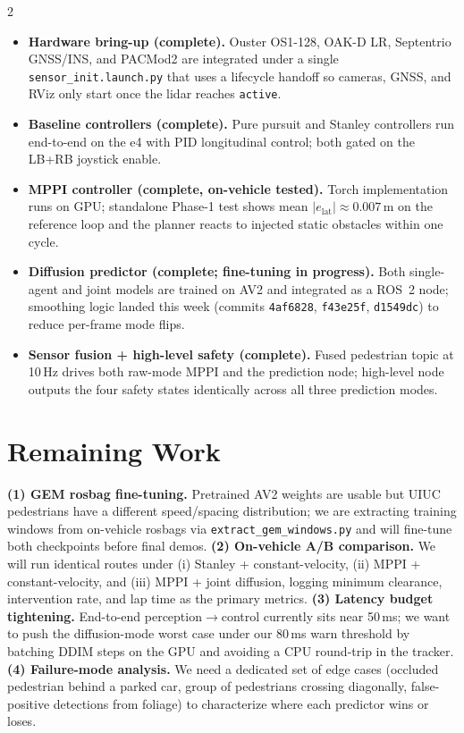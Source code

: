 \documentclass[10pt,letterpaper]{article}
\begin{document}
\begin{multicols}{2}
\begin{itemize}
  \item \textbf{Hardware bring-up (complete).} Ouster OS1-128, OAK-D LR,
        Septentrio GNSS/INS, and PACMod2 are integrated under a single
        \texttt{sensor\_init.launch.py} that uses a lifecycle handoff so
        cameras, GNSS, and RViz only start once the lidar reaches
        \texttt{active}.
  \item \textbf{Baseline controllers (complete).} Pure pursuit and
        Stanley controllers run end-to-end on the e4 with PID
        longitudinal control; both gated on the LB+RB joystick enable.
  \item \textbf{MPPI controller (complete, on-vehicle tested).} Torch
        implementation runs on GPU; standalone Phase-1 test shows mean
        $|e_{\text{lat}}|\!\approx\!0.007$\,m on the reference loop and
        the planner reacts to injected static obstacles within one
        cycle.
  \item \textbf{Diffusion predictor (complete; fine-tuning in
        progress).} Both single-agent and joint models are trained on
        AV2 and integrated as a ROS~2 node; smoothing logic landed this
        week (commits \texttt{4af6828}, \texttt{f43e25f},
        \texttt{d1549dc}) to reduce per-frame mode flips.
  \item \textbf{Sensor fusion + high-level safety (complete).} Fused
        pedestrian topic at 10\,Hz drives both raw-mode MPPI and the
        prediction node; high-level node outputs the four safety states
        identically across all three prediction modes.
\end{itemize}

\section{Remaining Work}

\textbf{(1) GEM rosbag fine-tuning.}  Pretrained AV2 weights are usable
but UIUC pedestrians have a different speed/spacing distribution; we are
extracting training windows from on-vehicle rosbags via
\texttt{extract\_gem\_windows.py} and will fine-tune both checkpoints
before final demos.
\textbf{(2) On-vehicle A/B comparison.}  We will run identical routes
under (i) Stanley + constant-velocity, (ii) MPPI + constant-velocity,
and (iii) MPPI + joint diffusion, logging minimum clearance,
intervention rate, and lap time as the primary metrics.
\textbf{(3) Latency budget tightening.}  End-to-end perception$\to$control
currently sits near 50\,ms; we want to push the diffusion-mode worst
case under our 80\,ms warn threshold by batching DDIM steps on the GPU
and avoiding a CPU round-trip in the tracker.
\textbf{(4) Failure-mode analysis.}  We need a dedicated set of edge
cases (occluded pedestrian behind a parked car, group of pedestrians
crossing diagonally, false-positive detections from foliage) to
characterize where each predictor wins or loses.


\end{multicols}
\end{document}
